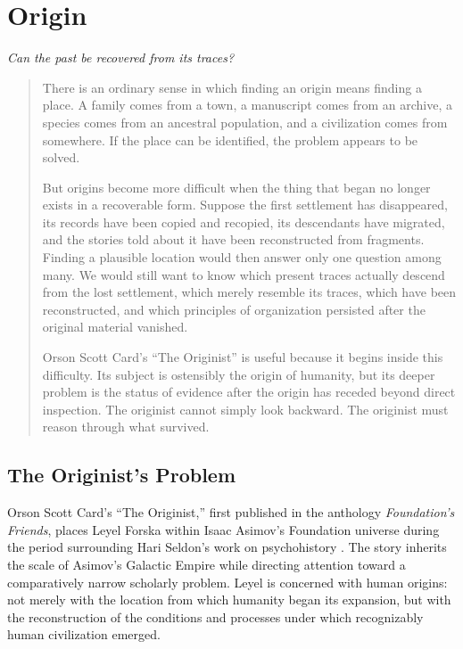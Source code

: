 \documentclass[
  11pt,
  a4paper,
  DIV=12,
  BCOR=0mm,
  parskip=half-
]{scrartcl}
\theoremstyle{definition}
\theoremstyle{plain}
\theoremstyle{remark}
\newcommand{\movementquestion}[1]{%
  \begin{center}
    \small\itshape
    #1
  \end{center}
  \medskip
}
\newenvironment{orientation}
  {%
    \begin{quote}
    \small
    \setlength{\parindent}{1em}
  }
  {%
    \end{quote}
  }
\begin{document}
\section{Origin}
\label{mov:origin}

\movementquestion{Can the past be recovered from its traces?}

\begin{orientation}
There is an ordinary sense in which finding an origin means finding a place.
A family comes from a town, a manuscript comes from an archive, a species
comes from an ancestral population, and a civilization comes from somewhere.
If the place can be identified, the problem appears to be solved.

But origins become more difficult when the thing that began no longer exists
in a recoverable form. Suppose the first settlement has disappeared, its
records have been copied and recopied, its descendants have migrated, and the
stories told about it have been reconstructed from fragments. Finding a
plausible location would then answer only one question among many. We would
still want to know which present traces actually descend from the lost
settlement, which merely resemble its traces, which have been reconstructed,
and which principles of organization persisted after the original material
vanished.

Orson Scott Card's ``The Originist'' is useful because it begins inside this
difficulty. Its subject is ostensibly the origin of humanity, but its deeper
problem is the status of evidence after the origin has receded beyond direct
inspection. The originist cannot simply look backward. The originist must
reason through what survived.
\end{orientation}


\subsection{The Originist's Problem}
\label{sec:originist-problem}

Orson Scott Card's ``The Originist,'' first published in the anthology
\emph{Foundation's Friends}, places Leyel Forska within Isaac Asimov's
Foundation universe during the period surrounding Hari Seldon's work on
psychohistory \cite{card1989}. The story inherits the scale of Asimov's
Galactic Empire while directing attention toward a comparatively narrow
scholarly problem. Leyel is concerned with human origins: not merely with the
location from which humanity began its expansion, but with the reconstruction
of the conditions and processes under which recognizably human civilization
emerged.
\end{document}
